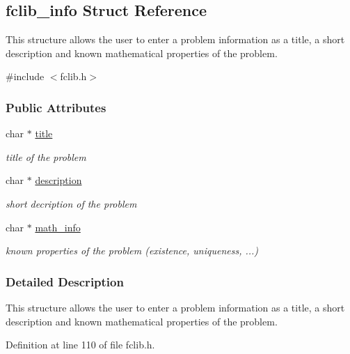 \hypertarget{structfclib__info}{}\subsection{fclib\+\_\+info Struct Reference}
\label{structfclib__info}


This structure allows the user to enter a problem information as a title, a short description and known mathematical properties of the problem.  




{\ttfamily \#include $<$fclib.\+h$>$}

\subsubsection*{Public Attributes}
\begin{DoxyCompactItemize}
\item 
char $\ast$ \mbox{\hyperlink{structfclib__info_a4ea1b298e3aa7228a5f2a55f711f41d2}{title}}
\begin{DoxyCompactList}\small\item\em title of the problem \end{DoxyCompactList}\item 
char $\ast$ \mbox{\hyperlink{structfclib__info_a0c1680fee67eaf7b20c436a775d4f35d}{description}}
\begin{DoxyCompactList}\small\item\em short decription of the problem \end{DoxyCompactList}\item 
char $\ast$ \mbox{\hyperlink{structfclib__info_ad6dadb3af34a719e5ec3cab2d499c7f2}{math\+\_\+info}}
\begin{DoxyCompactList}\small\item\em known properties of the problem (existence, uniqueness, ...) \end{DoxyCompactList}\end{DoxyCompactItemize}


\subsubsection{Detailed Description}
This structure allows the user to enter a problem information as a title, a short description and known mathematical properties of the problem. 

Definition at line 110 of file fclib.\+h.



